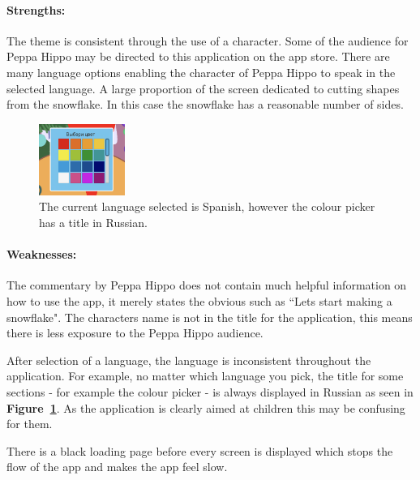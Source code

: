 \documentclass[11pt]{article}
\begin{document}
                \paragraph{Strengths:}
                The theme is consistent through the use of a character. Some of the audience for Peppa Hippo may be directed to this application on the app store. There are many language options enabling the character of Peppa Hippo to speak in the selected language. A large proportion of the screen dedicated to cutting shapes from the snowflake. In this case the snowflake has a reasonable number of sides. 

                \begin{figure}
                    \includegraphics[width=0.25\textwidth]{Images/peppa/peppaRussian.png}
                    \caption{The current language selected is Spanish, however the colour picker has a title in Russian.}
                    \label{fig:peppaRussian}
                \end{figure}
                \paragraph{Weaknesses:}
                The commentary by Peppa Hippo does not contain much helpful information on how to use the app, it merely states the obvious such as ``Lets start making a snowflake". The characters name is not in the title for the application, this means there is less exposure to the Peppa Hippo audience.
                
                After selection of a language, the language is inconsistent throughout the application. For example, no matter which language you pick, the title for some sections - for example the colour picker - is always displayed in Russian as seen in \textbf{Figure~\ref{fig:peppaRussian}}.  As the application is clearly aimed at children this may be confusing for them.
                
                There is a black loading page before every screen is displayed which stops the flow of the app and makes the app feel slow.
\end{document}
